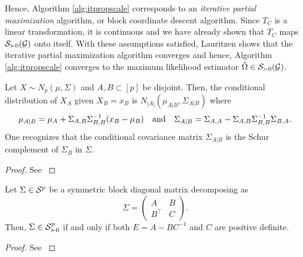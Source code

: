 Hence, Algorithm \ref{alg:itpropscale} corresponds to an \textit{iterative partial maximization} algorithm, or block coordinate descent algorithm. Since $T_C$ is a linear transformation, it is continuous and we have already shown that $T_C$ maps $\S_{\succ 0}(\G)$ onto itself. With these assumptions satisfied, Lauritzen \cite[Proposition A.3]{lauritzen1996} shows that the iterative partial maximization algorithm converges and hence, Algorithm \ref{alg:itpropscale} converges to the maximum likelihood estimator $\hat\Omega \in \S_{\succ 0}(\G)$.


\begin{lemma} \label{lem-gaussian-cond}
    Let $X \sim N_p(\mu, \Sigma)$ and $A, B \subset [p]$ be disjoint. Then, the conditional distribution of $X_A$ given $X_B = x_B$ is $N_{|A|}(\mu_{A|B}, \Sigma_{A|B})$ where
    \begin{align*}
        \mu_{A|B} = \mu_A + \Sigma_{A,B}\Sigma^{-1}_{B,B}(x_B - \mu_B) && \t{and} && \Sigma_{A|B} = \Sigma_{A,A} - \Sigma_{A,B}\Sigma^{-1}_{B,B}\Sigma_{B,A}.
    \end{align*} 
    One recognizes that the conditional covariance matrix $\Sigma_{A|B}$ is the Schur complement of $\Sigma_B$ in $\Sigma$.
\end{lemma}

\begin{proof}
    See \cite[Proposition C.5]{lauritzen1996}
\end{proof}

\begin{lemma} \label{lem-sym-psd}
    Let $\Sigma \in \S^p$ be a symmetric block diagonal matrix decomposing as
    \begin{equation*}
        \Sigma = \begin{pmatrix}
            A & B\\
            B^\top & C
        \end{pmatrix}.
    \end{equation*}
    Then, $\Sigma \in \S^p_{\succ 0}$ if and only if both $E = A - BC^{-1}$ and $C$ are positive definite.
\end{lemma}

\begin{proof}
    See \cite[Proposition B.1]{lauritzen1996}
\end{proof}